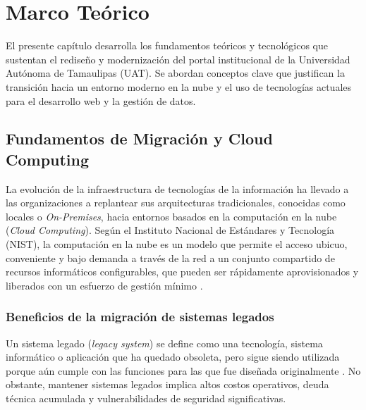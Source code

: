 \section{Marco Teórico}
\label{ch:marco_teorico}

El presente capítulo desarrolla los fundamentos teóricos y tecnológicos que sustentan el rediseño y modernización del portal institucional de la Universidad Autónoma de Tamaulipas (UAT). Se abordan conceptos clave que justifican la transición hacia un entorno moderno en la nube y el uso de tecnologías actuales para el desarrollo web y la gestión de datos.

\subsection{Fundamentos de Migración y Cloud Computing}
\label{sec:fundamentos_cloud}

La evolución de la infraestructura de tecnologías de la información ha llevado a las organizaciones a replantear sus arquitecturas tradicionales, conocidas como locales o \textit{On-Premises}, hacia entornos basados en la computación en la nube (\textit{Cloud Computing}). Según el Instituto Nacional de Estándares y Tecnología (NIST), la computación en la nube es un modelo que permite el acceso ubicuo, conveniente y bajo demanda a través de la red a un conjunto compartido de recursos informáticos configurables, que pueden ser rápidamente aprovisionados y liberados con un esfuerzo de gestión mínimo \cite{mell2011nist}.

\subsubsection*{Beneficios de la migración de sistemas legados}

Un sistema legado (\textit{legacy system}) se define como una tecnología, sistema informático o aplicación que ha quedado obsoleta, pero sigue siendo utilizada porque aún cumple con las funciones para las que fue diseñada originalmente \cite{bisbal1999legacy}. No obstante, mantener sistemas legados implica altos costos operativos, deuda técnica acumulada y vulnerabilidades de seguridad significativas.

